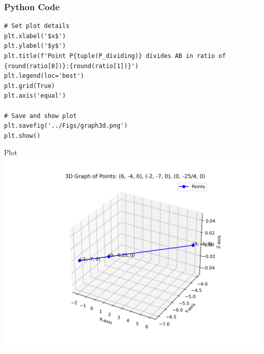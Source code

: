 \documentclass{beamer}
\begin{document}
\begin{frame}[fragile]
    \frametitle{Python Code}
    \begin{lstlisting}
# Set plot details
plt.xlabel('$x$')
plt.ylabel('$y$')
plt.title(f'Point P{tuple(P_dividing)} divides AB in ratio of {round(ratio[0])}:{round(ratio[1])}')
plt.legend(loc='best')
plt.grid(True)
plt.axis('equal')

# Save and show plot
plt.savefig('../Figs/graph3d.png')
plt.show()
  \end{lstlisting}
    \end{frame}

\begin{frame}{Plot}
    \centering
    \includegraphics[width=\columnwidth, height=0.8\textheight, keepaspectratio]{../Figs/graph3d.png}     
\end{frame}
\end{document}
